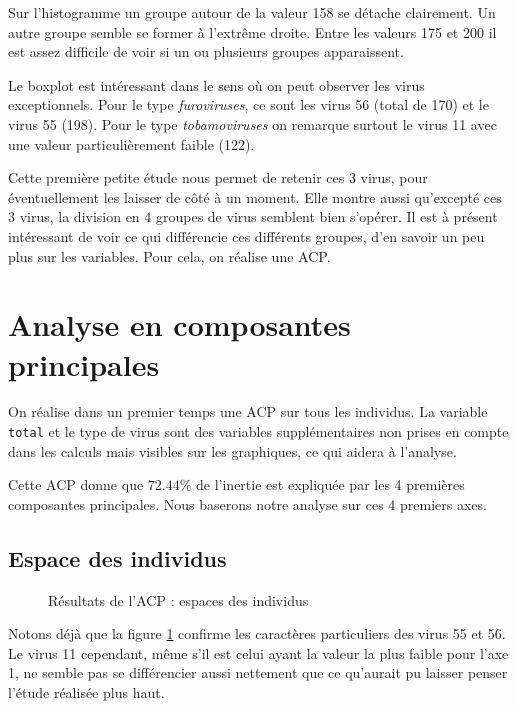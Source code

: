 \documentclass[a4paper]{report}
\begin{document}
Sur l'histogramme un groupe autour de la valeur 158 se détache clairement. Un autre groupe semble se former à l'extrême droite. Entre les valeurs 175 et 200 il est assez difficile de voir si un ou plusieurs groupes apparaissent.  

Le boxplot est intéressant dans le sens où on peut observer les virus exceptionnels. Pour le type \emph{furoviruses}, ce sont les virus 56 (total de 170) et le virus 55 (198). Pour le type \emph{tobamoviruses} on remarque surtout le virus 11 avec une valeur particulièrement faible (122).

Cette première petite étude nous permet de retenir ces 3 virus, pour éventuellement les laisser de côté à un moment. Elle montre aussi qu'excepté ces 3 virus, la division en 4 groupes de virus semblent bien s'opérer. Il est à présent intéressant de voir ce qui différencie ces différents groupes, d'en savoir un peu plus sur les variables. Pour cela, on réalise une ACP. 

\section{Analyse en composantes principales}
On réalise dans un premier temps une ACP sur tous les individus. La variable \verb|total| et le type de virus sont des variables supplémentaires non prises en compte dans les calculs mais visibles sur les graphiques, ce qui aidera à l'analyse. 

Cette ACP donne que $72.44\%$ de l'inertie est expliquée par les 4 premières composantes principales. Nous baserons notre analyse sur ces 4 premiers axes. 

\subsection{Espace des individus}

      \begin{figure}[!ht]

	\centering
	\caption{Résultats de l'ACP : espaces des individus}
	 \label{ACP1}
\end{figure}

Notons déjà que la figure \ref{ACP1} confirme les caractères particuliers des virus 55 et 56. Le virus 11 cependant, même s'il est celui ayant la valeur la plus faible pour l'axe 1, ne semble pas se différencier aussi nettement que ce qu'aurait pu laisser penser l'étude réalisée plus haut.
\end{document}
